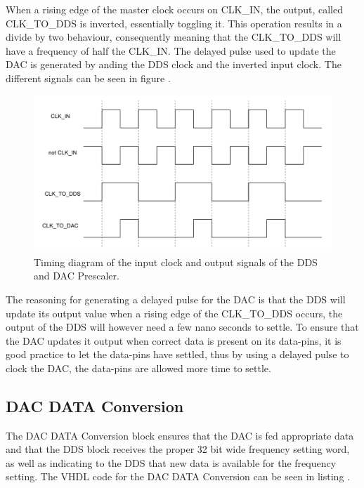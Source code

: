 

When a rising edge of the master clock occurs on CLK\_IN, the output, called CLK\_TO\_DDS is inverted, essentially toggling it. This operation results in a divide by two behaviour, consequently meaning that the CLK\_TO\_DDS will have a frequency of half the CLK\_IN. The delayed pulse used to update the DAC is generated by anding the DDS clock and the inverted input clock. The different signals can be seen in figure .

\begin{figure}[H]
    \centering
    \includegraphics[clip, trim=0 0 0 0, width=1\textwidth]{Sections/7_SystemDesign/Figures/DAC_PRESCALER.pdf}
    \caption{Timing diagram of the input clock and output signals of the DDS and DAC Prescaler.}
    \label{fig:7_2_3_DAC_PRESCALER}
\end{figure}

The reasoning for generating a delayed pulse for the DAC is that the DDS will update its output value when a rising edge of the CLK\_TO\_DDS occurs, the output of the DDS will however need a few nano seconds to settle. To ensure that the DAC updates it output when correct data is present on its data-pins, it is good practice to let the data-pins have settled, thus by using a delayed pulse to clock the DAC, the data-pins are allowed more time to settle.

\subsection{DAC DATA Conversion}
The DAC DATA Conversion block ensures that the DAC is fed appropriate data and that the DDS block receives the proper 32 bit wide frequency setting word, as well as indicating to the DDS that new data is available for the frequency setting. The VHDL code for the DAC DATA Conversion can be seen in listing .

